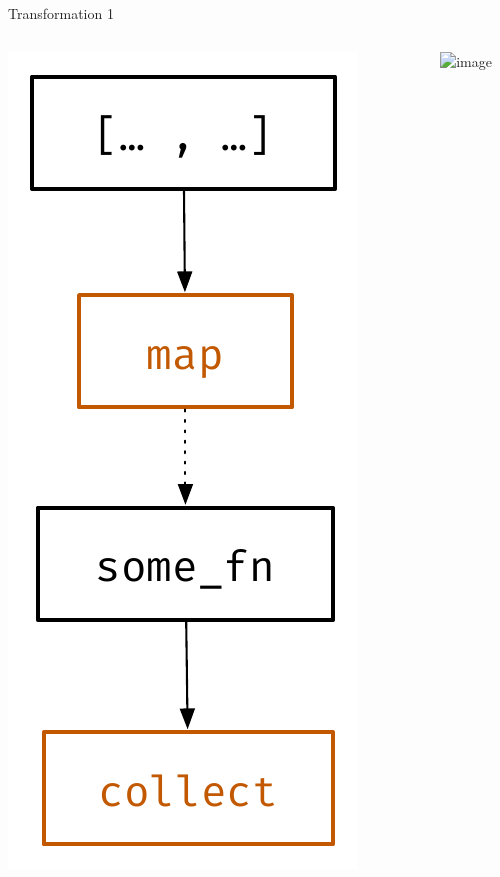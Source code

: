 \documentclass[aspectratio=169, usenames, dvipsnames]{beamer}
\begin{document}
\begin{frame}{Transformation 1}
    \centering
    \begin{columns}
        \begin{column}{0.2\textwidth}%
            \includegraphics[width=.7\textwidth,height=\textheight,keepaspectratio]{img/tf1_1}%
        \end{column}%
        \begin{column}{0.1\textwidth}%
            \centering
        \end{column}%
        \begin{column}{0.4\textwidth}%
            \includegraphics<2->[width=\textwidth,height=.7\textheight,keepaspectratio]{img/tf1_2}%
        \end{column}%
    \end{columns}
\end{frame}
\end{document}
